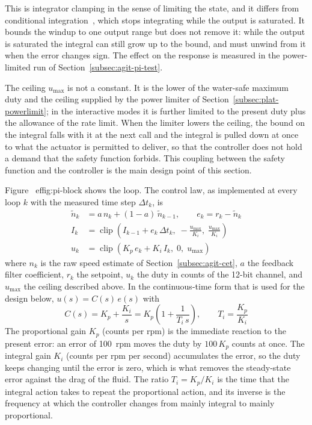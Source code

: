 This is integrator clamping in the sense of limiting the state, and it differs from conditional integration~\citep{bohn1995}, which stops integrating while the output is saturated. It bounds the windup to one output range but does not remove it: while the output is saturated the integral can still grow up to the bound, and must unwind from it when the error changes sign. The effect on the response is measured in the power-limited run of Section~\ref{subsec:agit-pi-test}.

The ceiling $u_{\max}$ is not a constant. It is the lower of the water-safe maximum duty and the ceiling supplied by the power limiter of Section~\ref{subsec:plat-powerlimit}; in the interactive modes it is further limited to the present duty plus the allowance of the rate limit. When the limiter lowers the ceiling, the bound on the integral falls with it at the next call and the integral is pulled down at once to what the actuator is permitted to deliver, so that the controller does not hold a demand that the safety function forbids. This coupling between the safety function and the controller is the main design point of this section.

Figure~
ef{fig:pi-block} shows the loop. The control law, as implemented at every loop $k$ with the measured time step $\Delta t_k$, is
\begin{align}
    \tilde{n}_k &= a\, n_k + (1 - a)\, \tilde{n}_{k-1}, \qquad e_k = r_k - \tilde{n}_k \label{eq:pi-fb}\\[2pt]
    I_k &= \operatorname{clip}\!\left(I_{k-1} + e_k\, \Delta t_k,\; -\frac{u_{\max}}{K_i},\; \frac{u_{\max}}{K_i}\right) \label{eq:pi-int}\\[2pt]
    u_k &= \operatorname{clip}\!\left(K_p\, e_k + K_i\, I_k,\; 0,\; u_{\max}\right) \label{eq:pi-law}
\end{align}
where $n_k$ is the raw speed estimate of Section~\ref{subsec:agit-cet}, $a$ the feedback filter coefficient, $r_k$ the setpoint, $u_k$ the duty in counts of the 12-bit channel, and $u_{\max}$ the ceiling described above. In the continuous-time form that is used for the design below, $u(s) = C(s)\,e(s)$ with
\begin{equation}
    C(s) = K_p + \frac{K_i}{s} = K_p\left(1 + \frac{1}{T_i\, s}\right), \qquad T_i = \frac{K_p}{K_i}
    \label{eq:pi-tf}
\end{equation}
The proportional gain $K_p$ (counts per rpm) is the immediate reaction to the present error: an error of 100~rpm moves the duty by $100\,K_p$ counts at once. The integral gain $K_i$ (counts per rpm per second) accumulates the error, so the duty keeps changing until the error is zero, which is what removes the steady-state error against the drag of the fluid. The ratio $T_i = K_p/K_i$ is the time that the integral action takes to repeat the proportional action, and its inverse is the frequency at which the controller changes from mainly integral to mainly proportional.

